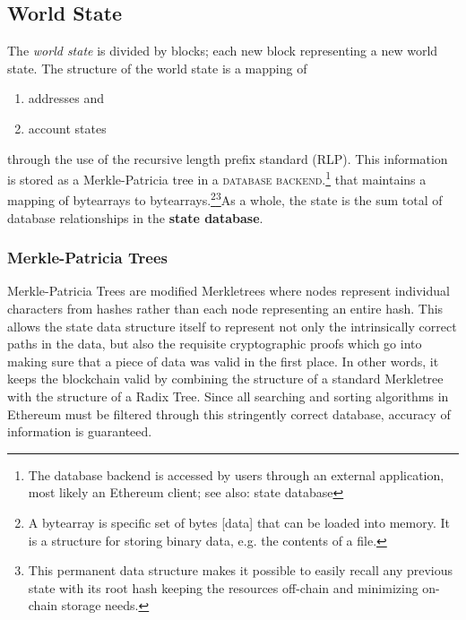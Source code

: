 \documentclass[10pt,a4paper,leqno,bibliography=totoc]{scrartcl}
\newenvironment{alphafootnotes}
{\par\edef\savedfootnotenumber{\number\value{footnote}}
\renewcommand{\thefootnote}{\alph{footnote}}
\setcounter{footnote}{0}}
{\par\setcounter{footnote}{\savedfootnotenumber}}
\begin{document}
\begin{alphafootnotes}
\begin{multicols*}{2}
			\subsection{World State}
				The \textit{world state} is divided by blocks; each new block representing a new world state. The structure of the world state is a mapping of 
				\begin{enumerate}
					\item addresses and 
					\item account states
				\end{enumerate}
				through the use of the recursive length prefix standard (RLP). This information is stored as a  Merkle-Patricia tree in a \textsc{database backend}.\footnote{The database backend is accessed by users through an external application, most likely an Ethereum client; see also: \gls{state database}} that maintains a mapping of bytearrays to bytearrays.\footnote{A bytearray is specific set of bytes [data] that can be loaded into memory. It is a structure for storing binary data, e.g. the contents of a file.}\footnote{This permanent data structure makes it possible to easily recall any previous state with its root hash keeping the resources off-chain and minimizing on-chain storage needs.}As a whole, the state is the sum total of database relationships in the \textbf{ \gls{state database}}. 
			
			\subsubsection{Merkle-Patricia Trees} 
	
				
	Merkle-Patricia Trees are modified Merkletrees where nodes represent individual characters from hashes rather than each node representing an entire hash. This allows the state data structure itself to represent not only the intrinsically correct paths in the data, but also the requisite cryptographic proofs which go into making sure that a piece of data was valid in the first place. In other words, it keeps the blockchain valid by combining the structure of a standard Merkletree with the structure of a Radix Tree. Since all searching and sorting algorithms in Ethereum must be filtered through this stringently correct database, accuracy of information is guaranteed. \par		
		

\end{multicols*}
\end{alphafootnotes}
\end{document}
